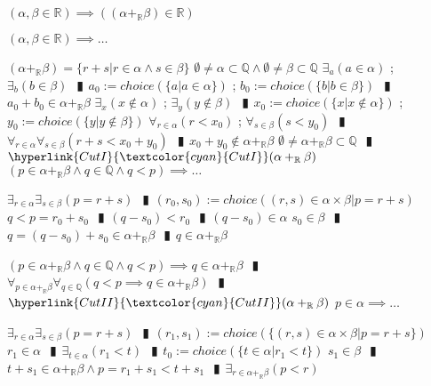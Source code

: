 \documentclass{book}
\newcommand{\wff}[1]{\hypertarget{#1}{\fbox{\textcolor{red}{$#1$}}\phantom{--}}}
\newcommand{\rf}[1]{\hyperlink{#1}{\textcolor{cyan}{#1}}}
\newcommand{\abr}{:=}
\newcommand{\pipe}{$\phantom{(}\vrectangleblack\phantom{)}$}
\newcommand{\pr}[1]{\left(#1\right)}
\begin{document}
\wff{FieldAdditionClosureOfR} $(\alpha, \beta \in \mathbb{R}) \implies \pr{(\alpha +_{\mathbb{R}} \beta) \in \mathbb{R}}$
\begin{enumerate}
  \lit $(\alpha, \beta \in \mathbb{R}) \implies \ldots$
  \begin{enumerate}
    \lit $(\alpha +_{\mathbb{R}} \beta) = \{r + s | r \in \alpha \land s \in \beta\}$
    \lit $\emptyset \neq \alpha \subset \mathbb{Q} \land \emptyset \neq \beta \subset \mathbb{Q}$
    \lit $\exists_{a}(a \in \alpha)$ ; $\exists_{b}(b \in \beta)$ \pipe $a_0 \abr choice(\{a | a \in \alpha\})$ ; $b_0 \abr choice(\{b | b \in \beta\})$ \pipe $a_0  + b_0 \in \alpha +_{\mathbb{R}} \beta$
    \lit $\exists_{x}(x \notin \alpha)$ ; $\exists_{y}(y \notin \beta)$ \pipe $x_0 \abr choice(\{x | x \notin \alpha\})$ ; $y_0 \abr choice(\{y | y \notin \beta\})$
    \lit $\forall_{r \in \alpha}(r < x_0)$ ; $\forall_{s \in \beta}(s < y_0)$ \pipe $\forall_{r \in \alpha} \forall_{s \in \beta}(r + s < x_0 + y_0)$ \pipe $x_0 + y_0 \not \in \alpha +_{\mathbb{R}} \beta$
    \lit $\emptyset \neq \alpha +_{\mathbb{R}} \beta \subset \mathbb{Q}$ \pipe $\rf{CutI}(\alpha +_{\mathbb{R}} \beta)$
    \lit $(p \in \alpha +_{\mathbb{R}} \beta \land q \in \mathbb{Q} \land q < p) \implies \ldots$
    \begin{enumerate}
      \lit $\exists_{r \in \alpha} \exists_{s \in \beta}(p = r + s)$ \pipe $(r_0, s_0) \abr choice({(r, s) \in \alpha \times \beta | p = r + s})$
      \lit $q < p = r_0 + s_0$ \pipe $(q - s_0) < r_0$ \pipe $(q - s_0) \in \alpha$
      \lit $s_0 \in \beta$ \pipe $q = (q - s_0) + s_0 \in \alpha +_{\mathbb{R}} \beta$ \pipe $q \in \alpha +_{\mathbb{R}} \beta$
    \end{enumerate}
    \lit $(p \in \alpha +_{\mathbb{R}} \beta \land q \in \mathbb{Q} \land q < p) \implies q \in \alpha +_{\mathbb{R}} \beta$ \pipe $\forall_{p \in \alpha +_{\mathbb{R}} \beta} \forall_{q \in \mathbb{Q}}(q < p \implies q \in \alpha +_{\mathbb{R}} \beta)$ \pipe $\rf{CutII}(\alpha +_{\mathbb{R}} \beta)$
    \lit $p \in \alpha \implies \ldots$
    \begin{enumerate}
      \lit $\exists_{r \in \alpha} \exists_{s \in \beta}(p = r + s)$ \pipe $(r_1, s_1) \abr choice(\{(r, s) \in \alpha \times \beta | p = r + s\})$
      \lit $r_1 \in \alpha$ \pipe $\exists_{t \in \alpha}(r_1 < t)$ \pipe $t_0 \abr choice(\{t \in \alpha | r_1 < t\})$
      \lit $s_1 \in \beta$ \pipe $t + s_1 \in \alpha +_{\mathbb{R}} \beta \land p = r_1 + s_1 < t + s_1$ \pipe $\exists_{r \in \alpha +_{\mathbb{R}} \beta}(p < r)$
    \end{enumerate}

\end{enumerate}
\end{enumerate}
\end{document}
